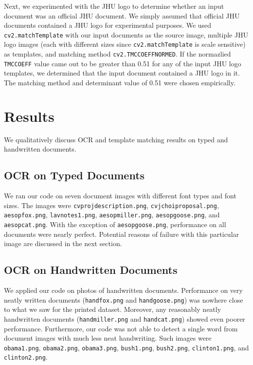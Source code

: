 \documentclass[11pt,letterpaper]{article}
\begin{document}
Next, we experimented with the JHU logo to determine whether an input document was an official JHU document. We simply assumed that official JHU documents contained a JHU logo for experimental purposes. We used {\tt cv2.matchTemplate} with our input documents as the source image, multiple JHU logo images (each with different sizes since {\tt cv2.matchTemplate} is scale sensitive) as templates, and matching method {\tt cv2.TM\textunderscore CCOEFF\textunderscore NORMED}. If the normazlied {\tt TM\textunderscore CCOEFF} value came out to be greater than 0.51 for any of the input JHU logo templates, we determined that the input document contained a JHU logo in it. The matching method and determinant value of 0.51 were chosen empirically.

\section{Results}

We qualitatively discuss OCR and template matching results on typed and handwritten documents.

\subsection{OCR on Typed Documents}

We ran our code on seven document images with different font types and font sizes. The images were {\tt cv\textunderscore proj\textunderscore description.png}, {\tt cv\textunderscore jchoi\textunderscore proposal.png}, {\tt aesop\textunderscore fox.png}, {\tt lav\textunderscore notes1.png}, {\tt aesop\textunderscore miller.png}, {\tt aesop\textunderscore goose.png}, and {\tt aesop\textunderscore cat.png}. With the exception of {\tt aesop\textunderscore goose.png}, performance on all documents were nearly perfect. Potential reasons of failure with this particular image are discussed in the next section.

\subsection{OCR on Handwritten Documents}

We applied our code on photos of handwritten documents. Performance on very neatly written documents ({\tt hand\textunderscore fox.png} and {\tt hand\textunderscore goose.png}) was nowhere close to what we saw for the printed dataset. Moreover, any reasonably neatly handwritten documents ({\tt hand\textunderscore miller.png} and {\tt hand\textunderscore cat.png}) showed even poorer performance.  Furthermore, our code was not able to detect a single word from document images with much less neat handwriting. Such images were {\tt obama1.png}, {\tt obama2.png}, {\tt obama3.png}, {\tt bush1.png}, {\tt bush2.png}, {\tt clinton1.png}, and {\tt clinton2.png}.
\end{document}

